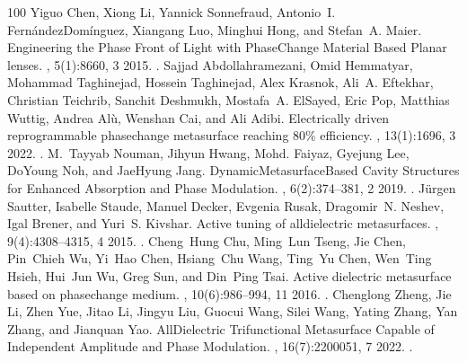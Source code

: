 \documentclass[a4paper,10pt,english,openany,oneside]{jupyterBook}
\begin{document}
\begin{sphinxthebibliography}{100}
\sphinxAtStartPar
Yiguo Chen, Xiong Li, Yannick Sonnefraud, Antonio I. Fernández\sphinxhyphen{}Domínguez, Xiangang Luo, Minghui Hong, and Stefan A. Maier. Engineering the Phase Front of Light with Phase\sphinxhyphen{}Change Material Based Planar lenses. , 5(1):8660, 3 2015. .
\sphinxAtStartPar
Sajjad Abdollahramezani, Omid Hemmatyar, Mohammad Taghinejad, Hossein Taghinejad, Alex Krasnok, Ali A. Eftekhar, Christian Teichrib, Sanchit Deshmukh, Mostafa A. El\sphinxhyphen{}Sayed, Eric Pop, Matthias Wuttig, Andrea Alù, Wenshan Cai, and Ali Adibi. Electrically driven reprogrammable phase\sphinxhyphen{}change metasurface reaching 80\% efficiency. , 13(1):1696, 3 2022. .
\sphinxAtStartPar
M. Tayyab Nouman, Jihyun Hwang, Mohd. Faiyaz, Gyejung Lee, Do\sphinxhyphen{}Young Noh, and Jae\sphinxhyphen{}Hyung Jang. Dynamic\sphinxhyphen{}Metasurface\sphinxhyphen{}Based Cavity Structures for Enhanced Absorption and Phase Modulation. , 6(2):374–381, 2 2019. .
\sphinxAtStartPar
Jürgen Sautter, Isabelle Staude, Manuel Decker, Evgenia Rusak, Dragomir N. Neshev, Igal Brener, and Yuri S. Kivshar. Active tuning of all\sphinxhyphen{}dielectric metasurfaces. , 9(4):4308–4315, 4 2015. .
\sphinxAtStartPar
Cheng Hung Chu, Ming Lun Tseng, Jie Chen, Pin Chieh Wu, Yi Hao Chen, Hsiang Chu Wang, Ting Yu Chen, Wen Ting Hsieh, Hui Jun Wu, Greg Sun, and Din Ping Tsai. Active dielectric metasurface based on phase\sphinxhyphen{}change medium. , 10(6):986–994, 11 2016. .
\sphinxAtStartPar
Chenglong Zheng, Jie Li, Zhen Yue, Jitao Li, Jingyu Liu, Guocui Wang, Silei Wang, Yating Zhang, Yan Zhang, and Jianquan Yao. All\sphinxhyphen{}Dielectric Trifunctional Metasurface Capable of Independent Amplitude and Phase Modulation. , 16(7):2200051, 7 2022. .

\end{sphinxthebibliography}
\end{document}
